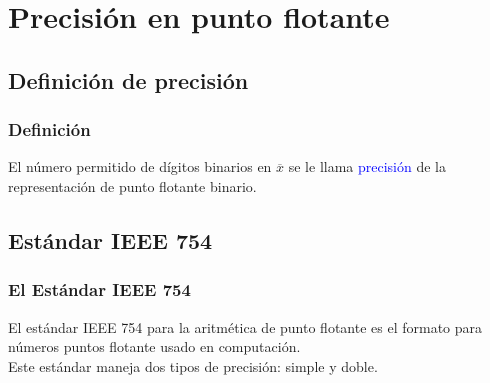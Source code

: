 \section{Precisión en punto flotante}
\subsection{Definición de precisión}
\begin{frame}
\frametitle{Definición}
El número permitido de dígitos binarios en $\overline{x}$ se le llama \textcolor{blue}{precisión} de la representación de punto flotante binario.
\end{frame}
\subsection{Estándar IEEE 754}
\begin{frame}
\frametitle{El Estándar IEEE 754}
El estándar IEEE 754 para la aritmética de punto flotante es el formato para números puntos flotante usado en computación.
\\
\bigskip
Este estándar maneja dos tipos de precisión: simple y doble.
\end{frame}

